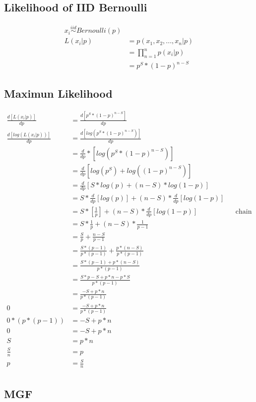 \documentclass[]{book}
\begin{document}
\subsection {Likelihood of IID Bernoulli}

\begin{align}
x_i \overset{iid}{\sim} Bernoulli(p)\\
L(x_i|p)&=p(x_1,x_2,...,x_n|p)\\&=\prod_{n=1}^np(x_i|p)\\
&=p^S*(1-p)^{n-S}
\end{align}

\subsection {Maximun Likelihood}

\begin{align}
\frac{d[L(x_i|p)]}{dp} &=\frac{d[p^S*(1-p)^{n-S}]}{dp}\\
\frac{d[log(L(x_i|p))]}{dp} &=\frac{d[log(p^S*(1-p)^{n-S})]}{dp}\\
&= \frac{d}{dp}*[log(p^S*(1-p)^{n-S})]\\
&= \frac{d}{dp}[log(p^S)+log((1-p)^{n-S})]\\
&= \frac{d}{dp}[S*log(p)+(n-S)*log(1-p)]\\
&= S*\frac{d}{dp}[log(p)]+(n-S)*\frac{d}{dp}[log(1-p)]\\
&= S*[\frac{1}{p}]+(n-S)*\frac{d}{dp}[log(1-p)] && \text{chain rule}\\
&= S*\frac{1}{p}+(n-S)*\frac{1}{p-1}\\
&= \frac{S}{p}+\frac{n-S}{p-1}\\
&= \frac{S*(p-1)}{p*(p-1)}+\frac{p*(n-S)}{p*(p-1)}\\
&= \frac{S*(p-1)+p*(n-S)}{p*(p-1)}\\
&= \frac{S*p-S+p*n-p*S}{p*(p-1)}\\
&= \frac{-S+p*n}{p*(p-1)}\\
0 &= \frac{-S+p*n}{p*(p-1)}\\
0*(p*(p-1)) &= -S+p*n\\
0 &= -S+p*n\\
S &= p*n\\
\frac{S}{n} &= p\\
p &= \frac{S}{n}\\
\end{align}

\subsection{MGF}
\end{document}

